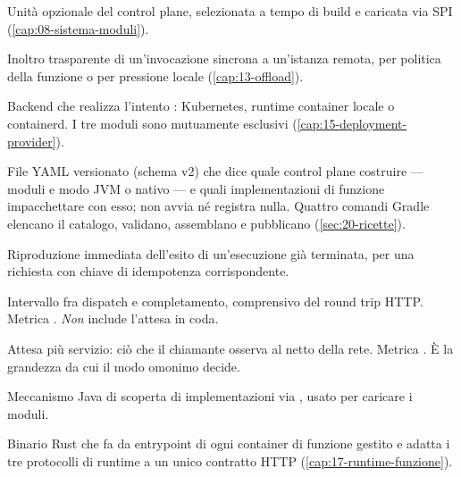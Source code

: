 \begin{description}[style=nextline, leftmargin=0pt, itemsep=2pt]
\item[\textbf{Modulo}] Unit\`a opzionale del control plane, selezionata a tempo
di build e caricata via SPI (\cref{cap:08-sistema-moduli}).

\item[\textbf{Offload}] Inoltro trasparente di un'invocazione sincrona a
un'istanza remota, per politica della funzione o per pressione locale
(\cref{cap:13-offload}).

\item[\textbf{Provider di deployment}] Backend che realizza l'intento
: Kubernetes, runtime container locale o containerd. I tre
moduli sono mutuamente esclusivi (\cref{cap:15-deployment-provider}).

\item[\textbf{Ricetta}] File YAML versionato (schema v2) che dice quale control plane
costruire --- moduli e modo JVM o nativo --- e quali implementazioni di funzione
impacchettare con esso; non avvia n\'e registra nulla. Quattro comandi Gradle
elencano il catalogo, validano, assemblano e pubblicano
(\cref{sec:20-ricette}).

\item[\textbf{Replay}] Riproduzione immediata dell'esito di un'esecuzione gi\`a
terminata, per una richiesta con chiave di idempotenza corrispondente.

\item[\textbf{Servizio} (\emph{service time})] Intervallo fra dispatch e
completamento, comprensivo del round trip HTTP. Metrica
. \emph{Non} include l'attesa in coda.

\item[\textbf{Sojourn}] Attesa pi\`u servizio: ci\`o che il chiamante osserva al
netto della rete. Metrica . \`E la grandezza da
cui il modo omonimo decide.

\item[\textbf{SPI} (\emph{Service Provider Interface})] Meccanismo Java di
scoperta di implementazioni via , usato per caricare i
moduli.

\item[\textbf{Watchdog}] Binario Rust che fa da entrypoint di ogni container di
funzione gestito e adatta i tre protocolli di runtime a un unico contratto HTTP
(\cref{cap:17-runtime-funzione}).

\end{description}
